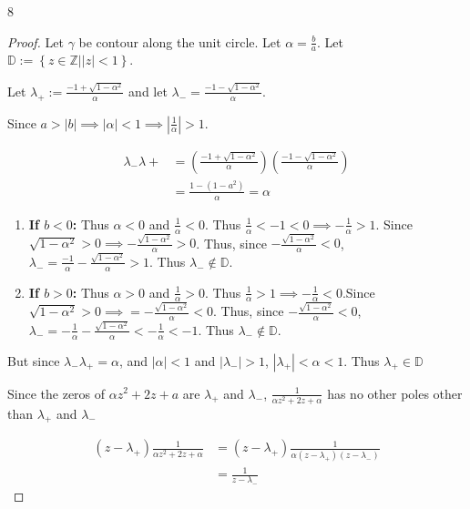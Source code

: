 \documentclass{article}
\newcommand{\Z}{\mathbb{Z}}
\newcommand{\abs}[1]{\left\lvert #1\right\rvert}
\begin{document}
\begin{PROB}{8}\label{Problem 8.}
\end{PROB}
\begin{proof}
    Let $\gamma$ be contour along the unit circle. Let $\alpha = \frac{b}{a}$. Let $\mathbb{D} := \left\{ z \in \Z | |z| < 1 \right\}$. 
    
    Let $\lambda_+ := \frac{-1 + \sqrt{1 - \alpha^2}}{\alpha}$ and let $\lambda_- = \frac{-1 - \sqrt{1 - \alpha^2}}{\alpha}$.

    Since $a > |b| \implies |\alpha| < 1 \implies \abs{\frac{1}{\alpha}} > 1$.
    
    
    \begin{align*}
        \lambda_- \lambda+ &= \left(\frac{-1 + \sqrt{1 - \alpha^2}}{\alpha}\right)\left(\frac{-1 - \sqrt{1 - \alpha^2}}{\alpha}\right) \\
        &= \frac{1 - (1 - a^2)}{\alpha} = \alpha
    \end{align*}

    \begin{enumerate}
        \item \textbf{If $b < 0$:} Thus $\alpha < 0$ and $\frac{1}{\alpha} < 0$. Thus $\frac{1}{\alpha} < -1 < 0 \implies -\frac{1}{\alpha} > 1$. Since $\sqrt{1 - \alpha^2} > 0 \implies -\frac{\sqrt{1 - \alpha^2}}{\alpha} > 0$. Thus, since $-\frac{\sqrt{1 - \alpha^2}}{\alpha} < 0 $,  $\lambda_- = \frac{-1}{\alpha} -\frac{\sqrt{1 - \alpha^2}}{\alpha} > 1 $. Thus $\lambda_- \not \in \mathbb{D}$. 
        \item \textbf{If $b > 0$:} Thus $\alpha > 0$ and $\frac{1}{\alpha} > 0$. Thus $\frac{1}{\alpha} > 1 \implies -\frac{1}{\alpha} < 0$.Since $\sqrt{1 - \alpha^2} > 0 \implies = -\frac{\sqrt{1 - \alpha^2}}{\alpha} < 0$. Thus, since $-\frac{\sqrt{1 - \alpha^2}}{\alpha} < 0 $,  $\lambda_- = -\frac{1}{\alpha} - \frac{\sqrt{1 - \alpha^2}}{\alpha} < -\frac{1}{\alpha} < -1 $. Thus $\lambda_- \not \in \mathbb{D}$.
    \end{enumerate}

    But since $\lambda_- \lambda_+ = \alpha$, and $\abs{\alpha} < 1$ and $\abs{\lambda_-} > 1$, $\abs{\lambda_+} < \alpha < 1$. Thus $\lambda_+ \in \mathbb{D}$
        
    Since the zeros of $\alpha z^2 + 2z + a$ are $\lambda_+$ and $\lambda_-$, $\frac{1}{\alpha z^2 + 2 z + \alpha}$ has no other poles other than $\lambda_+$ and $\lambda_-$       
    
    \begin{align*}
        (z - \lambda_+) \frac{1}{\alpha z^2 + 2 z + \alpha} &= (z - \lambda_+) \frac{1}{\alpha (z - \lambda_+)(z - \lambda_{-})} \\
        &= \frac{1}{z - \lambda_-}
    \end{align*}


\end{proof}
\end{document}
